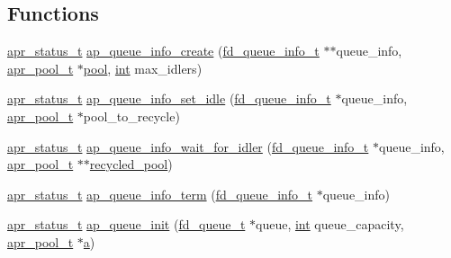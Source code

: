 \subsection*{Functions}
\begin{DoxyCompactItemize}
\item 
\hyperlink{group__apr__errno_gaa5105fa83cc322f09382292db8b47593}{apr\+\_\+status\+\_\+t} \hyperlink{group__APACHE__MPM__WORKER_ga0454170ba8018a7ce2db3ecd14135657}{ap\+\_\+queue\+\_\+info\+\_\+create} (\hyperlink{structfd__queue__info__t}{fd\+\_\+queue\+\_\+info\+\_\+t} $\ast$$\ast$queue\+\_\+info, \hyperlink{structapr__pool__t}{apr\+\_\+pool\+\_\+t} $\ast$\hyperlink{group__APR__XLATE_gabb3cd978f04c73d0b763c391e9bfde73}{pool}, \hyperlink{pcre_8txt_a42dfa4ff673c82d8efe7144098fbc198}{int} max\+\_\+idlers)
\item 
\hyperlink{group__apr__errno_gaa5105fa83cc322f09382292db8b47593}{apr\+\_\+status\+\_\+t} \hyperlink{group__APACHE__MPM__WORKER_ga7673a5c9eda89916d6df264fdfdba2b5}{ap\+\_\+queue\+\_\+info\+\_\+set\+\_\+idle} (\hyperlink{structfd__queue__info__t}{fd\+\_\+queue\+\_\+info\+\_\+t} $\ast$queue\+\_\+info, \hyperlink{structapr__pool__t}{apr\+\_\+pool\+\_\+t} $\ast$pool\+\_\+to\+\_\+recycle)
\item 
\hyperlink{group__apr__errno_gaa5105fa83cc322f09382292db8b47593}{apr\+\_\+status\+\_\+t} \hyperlink{group__APACHE__MPM__WORKER_ga7e0fa1c1b5681b774ad15366f909e55b}{ap\+\_\+queue\+\_\+info\+\_\+wait\+\_\+for\+\_\+idler} (\hyperlink{structfd__queue__info__t}{fd\+\_\+queue\+\_\+info\+\_\+t} $\ast$queue\+\_\+info, \hyperlink{structapr__pool__t}{apr\+\_\+pool\+\_\+t} $\ast$$\ast$\hyperlink{structrecycled__pool}{recycled\+\_\+pool})
\item 
\hyperlink{group__apr__errno_gaa5105fa83cc322f09382292db8b47593}{apr\+\_\+status\+\_\+t} \hyperlink{group__APACHE__MPM__WORKER_gaae8ca4deac4b25a12d826ba68569f608}{ap\+\_\+queue\+\_\+info\+\_\+term} (\hyperlink{structfd__queue__info__t}{fd\+\_\+queue\+\_\+info\+\_\+t} $\ast$queue\+\_\+info)
\item 
\hyperlink{group__apr__errno_gaa5105fa83cc322f09382292db8b47593}{apr\+\_\+status\+\_\+t} \hyperlink{group__APACHE__MPM__WORKER_ga3c7e0f17e79985d68cf97adbe01966a4}{ap\+\_\+queue\+\_\+init} (\hyperlink{structfd__queue__t}{fd\+\_\+queue\+\_\+t} $\ast$queue, \hyperlink{pcre_8txt_a42dfa4ff673c82d8efe7144098fbc198}{int} queue\+\_\+capacity, \hyperlink{structapr__pool__t}{apr\+\_\+pool\+\_\+t} $\ast$\hyperlink{pcre_8txt_a841271aab70f5cda9412a19c7753f02c}{a})
\item 

\end{DoxyCompactItemize}
